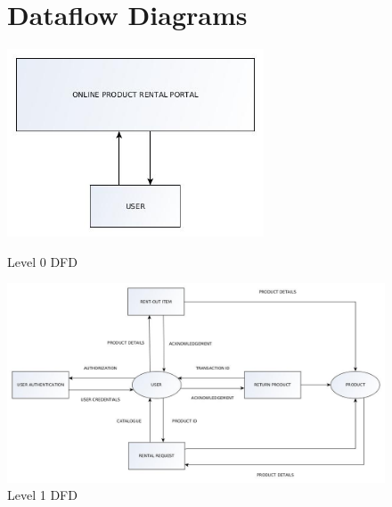 \documentclass[11pt]{report}
\begin{document}
\begin{figure}[h]
\section{Dataflow Diagrams}
  \centering
    \includegraphics[width=3in]{level0.jpg} 
	\caption{Level 0 DFD}
\vspace{1cm}
  \centering
    \includegraphics[width=\textwidth]{level1.jpg} 
	\caption{Level 1 DFD}
\end{figure}


\end{document}
